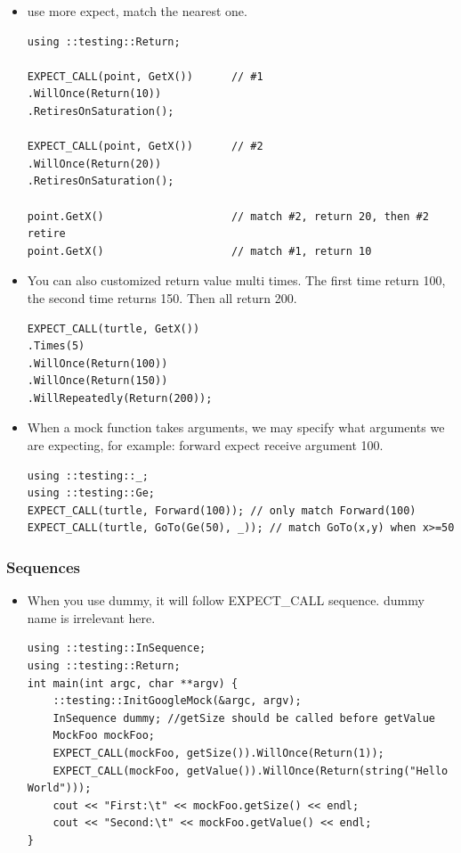 \documentclass[a4paper,11pt,twoside]{book}
\begin{document}
\begin{itemize}
	\item use more expect, match the nearest one.
\begin{lstlisting}
using ::testing::Return;

EXPECT_CALL(point, GetX())		// #1
.WillOnce(Return(10))
.RetiresOnSaturation();

EXPECT_CALL(point, GetX())		// #2
.WillOnce(Return(20))
.RetiresOnSaturation();

point.GetX()					// match #2, return 20, then #2 retire
point.GetX()					// match #1, return 10
\end{lstlisting}	

	\item You can also customized return value multi times. The first time return 100, the second time returns 150. Then all return 200.
\begin{lstlisting}
EXPECT_CALL(turtle, GetX())
.Times(5)
.WillOnce(Return(100))
.WillOnce(Return(150))
.WillRepeatedly(Return(200));	
\end{lstlisting}

	\item When a mock function takes arguments, we may specify what arguments we are expecting, for example: forward expect receive argument 100. 
\begin{lstlisting}
using ::testing::_;
using ::testing::Ge;
EXPECT_CALL(turtle, Forward(100)); // only match Forward(100)
EXPECT_CALL(turtle, GoTo(Ge(50), _)); // match GoTo(x,y) when x>=50
\end{lstlisting}

\end{itemize}

\subsubsection{Sequences}
\begin{itemize}
	
	\item When you use dummy, it will follow EXPECT\_CALL sequence. dummy name is irrelevant here.
	
\begin{lstlisting}
using ::testing::InSequence;
using ::testing::Return;
int main(int argc, char **argv) {
	::testing::InitGoogleMock(&argc, argv);
	InSequence dummy; //getSize should be called before getValue
	MockFoo mockFoo;
	EXPECT_CALL(mockFoo, getSize()).WillOnce(Return(1));
	EXPECT_CALL(mockFoo, getValue()).WillOnce(Return(string("Hello World")));
	cout << "First:\t" << mockFoo.getSize() << endl;
	cout << "Second:\t" << mockFoo.getValue() << endl;
}	
\end{lstlisting}

\end{itemize}
\end{document}

